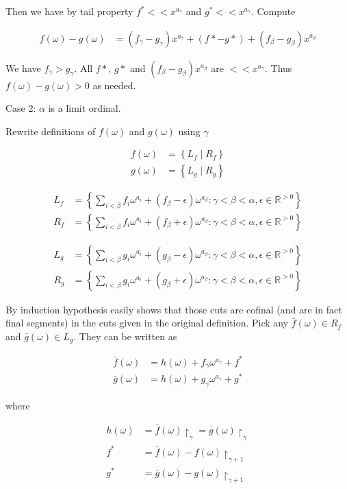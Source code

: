 \documentclass{article}
\newcommand{\curly}[1]{\left\{ #1 \right\}}
\newcommand{\R}{\mathbb{R}}
\newcommand{\w}{\omega}
\newcommand{\midr}[1]{\restriction_{#1}}
\begin{document}
Then we have by tail property $f^* << x^{a_\gamma}$ and $g^* << x^{a_\gamma}$. Compute

\begin{align*}
  f(\w) - g(\w) &= (f_\gamma - g_\gamma) x^{a_\gamma} + (f* - g*) + (f_\beta - g_\beta) x^{a_\beta}
\end{align*}

We have $f_\gamma > g_\gamma$.
All $f*$, $g*$ and $(f_\beta - g_\beta) x^{a_\beta}$ are  $<< x^{a_\gamma}$.
Thus $f(\w) - g(\w) > 0$ as needed.

Case 2: $\alpha$ is a limit ordinal.

Rewrite definitions of $f(\w)$ and $g(\w)$ using $\gamma$

\begin{align*}
  f(\w) &= \curly{L_f \mid R_f} \\
  g(\w) &= \curly{L_g \mid R_g}
\end{align*}

\begin{align*}
  L_f &= \curly{\sum_{i < \beta} f_i \w^{a_i} + (f_\beta - \epsilon) \w^{a_\beta}
	\colon \gamma < \beta < \alpha, \epsilon \in \R^{>0}} \\
  R_f &= \curly{\sum_{i < \beta} f_i \w^{a_i} + (f_\beta + \epsilon) \w^{a_\beta}
	\colon \gamma < \beta < \alpha, \epsilon \in \R^{>0}}
\end{align*}

\begin{align*}
  L_g &= \curly{\sum_{i < \beta} g_i \w^{a_i} + (g_\beta - \epsilon) \w^{a_\beta}
	\colon \gamma < \beta < \alpha, \epsilon \in \R^{>0}} \\
  R_g &= \curly{\sum_{i < \beta} g_i \w^{a_i} + (g_\beta + \epsilon) \w^{a_\beta}
	\colon \gamma < \beta < \alpha, \epsilon \in \R^{>0}}
\end{align*}

By induction hypothesis easily shows that those cuts are cofinal (and are in fact final segments) in the cuts given in the original definition. Pick any $\bar f(\w) \in R_f$ and $\bar g(\w) \in L_g$. They can be written as 

\begin{align*}
  \bar f(\w) &= h(\w) + f_\gamma \w^{a_\gamma} + f^*\\
  \bar g(\w) &= h(\w) + g_\gamma \w^{a_\gamma} + g^*
\end{align*}

where

\begin{align*}
	h(\w) &= \bar f(\w)\midr\gamma = \bar g(\w)\midr\gamma \\
	f^* &= \bar f(\w) - f(\w)\midr{\gamma + 1} \\
	g^* &= \bar g(\w) - g(\w)\midr{\gamma + 1}
\end{align*}
\end{document}
